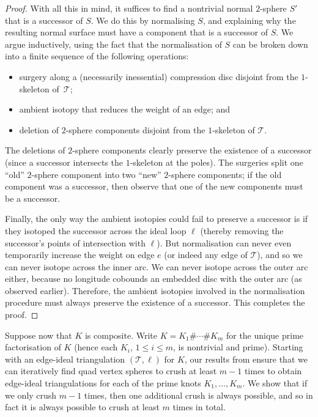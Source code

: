 \documentclass[a4paper,UKenglish,cleveref, autoref, thm-restate]{lipics-v2021}
\newcommand{\tri}{\mathcal{T}}
\begin{document}
\begin{proof}
With all this in mind, it suffices to find a nontrivial normal $2$-sphere $S'$ that is a successor of $S$.
We do this by normalising $S$, and explaining why the resulting normal surface must have a component that is a successor of $S$.
We argue inductively, using the fact that the normalisation of $S$ can be broken down into a finite sequence of the following operations:
\begin{itemize}
\item
surgery along a (necessarily inessential) compression disc disjoint from the $1$-skeleton of~$\tri$;
\item
ambient isotopy that reduces the weight of an edge; and
\item
deletion of $2$-sphere components disjoint from the $1$-skeleton of $\tri$.
\end{itemize}
The deletions of $2$-sphere components clearly preserve the existence of a successor (since a successor intersects the $1$-skeleton at the poles).
The surgeries split one ``old'' $2$-sphere component into two ``new'' $2$-sphere components;
if the old component was a successor, then observe that one of the new components must be a successor.

Finally, the only way the ambient isotopies could fail to preserve a successor is if they isotoped the successor across the ideal loop $\ell$ (thereby removing the successor's points of intersection with $\ell$).
But normalisation can never even temporarily increase the weight on edge $e$ (or indeed any edge of $\tri$), and so we can never isotope across the inner arc.
We can never isotope across the outer arc either, because no longitude cobounds an embedded disc with the outer arc (as observed earlier).
Therefore, the ambient isotopies involved in the normalisation procedure must always preserve the existence of a successor.
This completes the proof.
\end{proof}

Suppose now that $K$ is composite.
Write $K = K_1 \# \cdots \# K_m$ for the unique prime factorisation of $K$ (hence each $K_i$, $1\leqslant i \leqslant m$, is nontrivial and prime).
Starting with an edge-ideal triangulation $(\tri,\ell)$ for $K$, our results from  ensure that we can iteratively find quad vertex spheres to crush at least $m-1$ times to obtain edge-ideal triangulations for each of the prime knots $K_1,\ldots,K_m$.
We show that if we only crush $m-1$ times, then one additional crush is always possible, and so in fact it is always possible to crush at least $m$ times in total.
\end{document}
